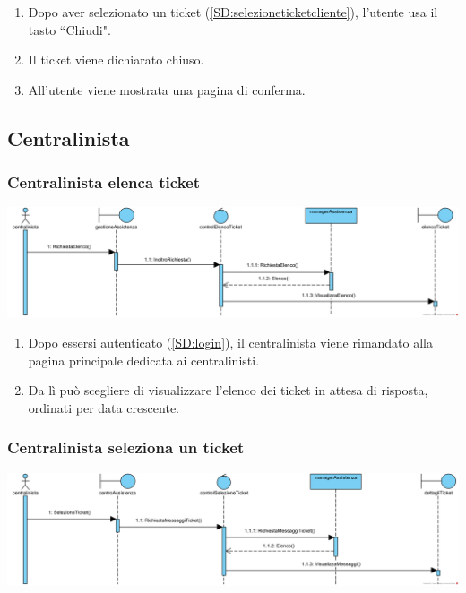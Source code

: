 \documentclass[12pt,a4paper]{article}
\begin{document}
\begin{enumerate}
\item Dopo aver selezionato un ticket (\ref{SD:selezioneticketcliente}), l'utente usa il tasto ``Chiudi".
\item Il ticket viene dichiarato chiuso.
\item All'utente viene mostrata una pagina di conferma.
\end{enumerate}

\newpage

\subsection{Centralinista}

\subsubsection{Centralinista elenca ticket}
\label{SD:centralinistaelencaticket}

\begin{center}
\includegraphics[width=\textwidth]{SequenceDiagram/CentralinistaTicketElenco}
\end{center}

\begin{enumerate}
\item Dopo essersi autenticato (\ref{SD:login}), il centralinista viene rimandato alla pagina principale dedicata ai centralinisti. 
\item Da lì può scegliere di visualizzare l'elenco dei ticket in attesa di risposta, ordinati per data crescente.
\end{enumerate}

\subsubsection{Centralinista seleziona un ticket}
\label{SD:selezioneticketcentralinista}

\begin{center}
\includegraphics[width=\textwidth]{SequenceDiagram/CentralinistaTicketSeleziona}
\end{center}
\end{document}
